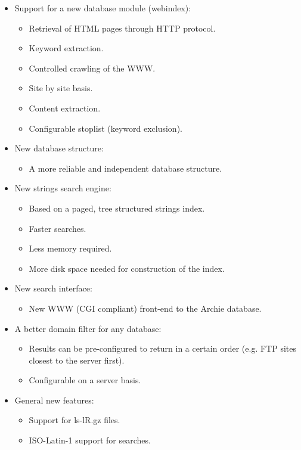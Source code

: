 \begin{itemize}
\item Support for a new database module (webindex):
  \begin{itemize}
    \item Retrieval of HTML pages through HTTP protocol.
    \item Keyword extraction.
    \item Controlled crawling of the WWW.
    \item Site by site basis.
    \item Content extraction.
    \item Configurable stoplist (keyword exclusion).
  \end{itemize}
\item New database structure:
  \begin{itemize}
    \item A more reliable and independent database structure. 
  \end{itemize}
\item New strings search engine:
  \begin{itemize}
    \item Based on a paged, tree structured strings index.
    \item Faster searches.
    \item Less memory required.
    \item More disk space needed for construction of the index.
  \end{itemize}
\item New search interface:
  \begin{itemize}
    \item New WWW (CGI compliant) front-end to the Archie database.
  \end{itemize}
\item A better domain filter for any database:
  \begin{itemize}
    \item Results can be pre-configured to return in a certain order (e.g. FTP sites closest to the server first).
    \item Configurable on a server basis.
  \end{itemize}
\item General new features:
  \begin{itemize}
    \item Support for ls-lR.gz files.
    \item ISO-Latin-1 support for searches.
  \end{itemize}
\end{itemize}




